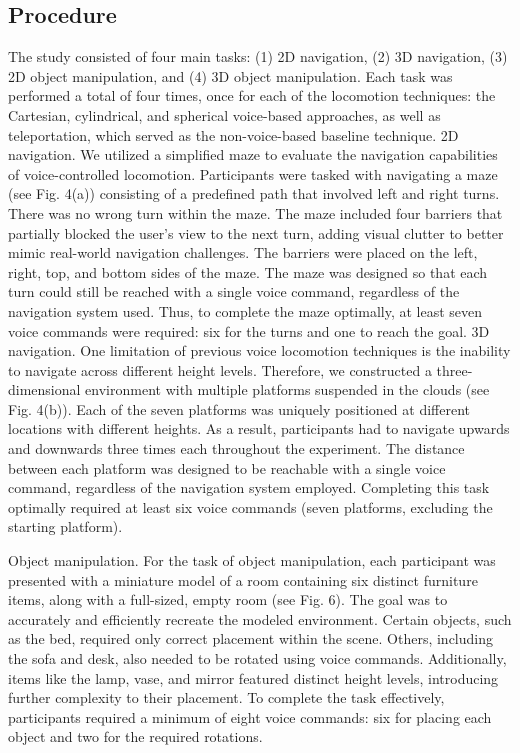 \documentclass[preprint,12pt]{elsarticle}
\newcommand{\reftext}[1]{{\color{gray}#1}}   %
\begin{document}
\subsection{Procedure}
\reftext{The study consisted of four main tasks: (1) 2D navigation, (2) 3D navigation, (3) 2D object manipulation, and (4) 3D object manipulation. Each task was performed a total of four times, once for each of the locomotion techniques: the Cartesian, cylindrical, and spherical voice-based approaches, as well as teleportation, which served as the non-voice-based baseline technique. 2D navigation. We utilized a simplified maze to evaluate the navigation capabilities of voice-controlled locomotion. Participants were tasked with navigating a maze (see Fig. 4(a)) consisting of a predefined path that involved left and right turns. There was no wrong turn within the maze. The maze included four barriers that partially blocked the user's view to the next turn, adding visual clutter to better mimic real-world navigation challenges. The barriers were placed on the left, right, top, and bottom sides of the maze. The maze was designed so that each turn could still be reached with a single voice command, regardless of the navigation system used. Thus, to complete the maze optimally, at least seven voice commands were required: six for the turns and one to reach the goal. 3D navigation. One limitation of previous voice locomotion techniques is the inability to navigate across different height levels. Therefore, we constructed a three-dimensional environment with multiple platforms suspended in the clouds (see Fig. 4(b)). Each of the seven platforms was uniquely positioned at different locations with different heights. As a result, participants had to navigate upwards and downwards three times each throughout the experiment. The distance between each platform was designed to be reachable with a single voice command, regardless of the navigation system employed. Completing this task optimally required at least six voice commands (seven platforms, excluding the starting platform).}

\reftext{Object manipulation. For the task of object manipulation, each participant was presented with a miniature model of a room containing six distinct furniture items, along with a full-sized, empty room (see Fig. 6). The goal was to accurately and efficiently recreate the modeled environment. Certain objects, such as the bed, required only correct placement within the scene. Others, including the sofa and desk, also needed to be rotated using voice commands. Additionally, items like the lamp, vase, and mirror featured distinct height levels, introducing further complexity to their placement. To complete the task effectively, participants required a minimum of eight voice commands: six for placing each object and two for the required rotations.}
\end{document}
